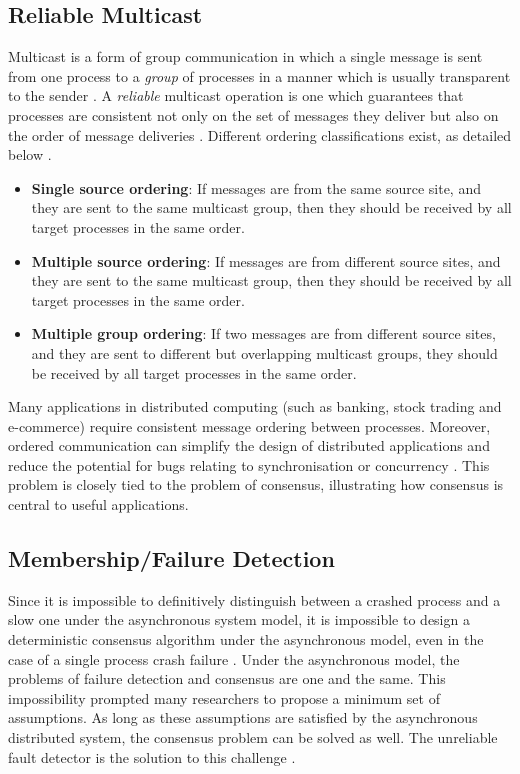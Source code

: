 \documentclass[12pt, a4paper]{article}
\begin{document}
\subsection{Reliable Multicast}
Multicast is a form of group communication in which a single message is sent from one process to a \textit{group} of processes in a manner which is usually transparent to the sender \cite{coulouris2005distributed}. A \textit{reliable} multicast operation is one which guarantees that processes are consistent not only on the set of messages they deliver but also on the order of message deliveries \cite{fritzke2001consensus}. Different ordering classifications exist, as detailed below \cite{garcia1991ordered}.

\begin{itemize}
  \item \textbf{Single source ordering}: If messages are from the same source
  site, and they are sent to the same multicast group, then they should be
  received by all target processes in the same order.
  \item \textbf{Multiple source ordering}: If messages are from different
  source sites, and they are sent to the same multicast group,
  then they should be received by all target processes in the same order.
  \item \textbf{Multiple group ordering}: If two messages are from different
  source sites, and they are sent to different but overlapping multicast groups,
  they should be received by all target processes in the same order.
\end{itemize}

Many applications in distributed computing (such as banking, stock trading and e-commerce) require consistent message ordering between processes. Moreover, ordered communication can simplify the design of distributed applications and reduce the potential for bugs relating to synchronisation or concurrency \cite{garcia1991ordered}. This problem is closely tied to the problem of consensus, illustrating how consensus is central to useful applications.

\subsection{Membership/Failure Detection}
Since it is impossible to definitively distinguish between a crashed process and a slow one under the asynchronous system model, it is impossible to design a deterministic consensus algorithm under the asynchronous model, even in the case of a single process crash failure \cite{fischer1985impossibility}. Under the asynchronous model, the problems of failure detection and consensus are one and the same. This impossibility prompted many researchers to propose a minimum set of assumptions. As long as these assumptions are satisfied by the asynchronous distributed system, the consensus problem can be solved as well. The unreliable fault detector is the solution to this challenge \cite{chandra1996unreliable}.
\end{document}
